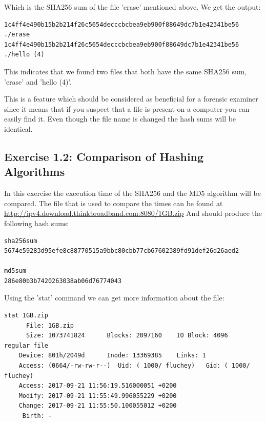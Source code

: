 \documentclass[a4paper,10pt,oneside]{article}
\begin{document}
Which is the SHA256 sum of the file 'erase' mentioned above. We get the output:

\begin{lstlisting}[caption=Result from above example]
1c4ff4e490b15b2b214f26c5654decccbcbea9eb900f88649dc7b1e42341be56  ./erase
1c4ff4e490b15b2b214f26c5654decccbcbea9eb900f88649dc7b1e42341be56  ./hello (4)
\end{lstlisting}

This indicates that we found two files that both have the same SHA256 sum, 'erase' and 'hello (4)'.

This is a feature which should be considered as beneficial for a forensic examiner since it means that if you suspect that a file is present on a computer you can
easily find it. Even though the file name is changed the hash sums will be identical.

\subsection{Exercise 1.2: Comparison of Hashing Algorithms}
In this exercise the execution time of the SHA256 and the MD5 algorithm will be compared. The file that is used to compare the times can be found at \url{http://ipv4.download.thinkbroadband.com:8080/1GB.zip}
And should produce the following hash sums:

\begin{lstlisting}[caption=Hash sums for file used in exercise]
sha256sum
5674e59283d95efe8c88770515a9bbc80cbb77cb67602389fd91def26d26aed2

md5sum
286e80b3b7420263038ab06d76774043
\end{lstlisting}

Using the 'stat' command we can get more information about the file:

\begin{lstlisting}[caption=Result from 'stat' command]
stat 1GB.zip
      File: 1GB.zip
      Size: 1073741824      Blocks: 2097160    IO Block: 4096   regular file
    Device: 801h/2049d      Inode: 13369385    Links: 1
    Access: (0664/-rw-rw-r--)  Uid: ( 1000/ fluchey)   Gid: ( 1000/ fluchey)
    Access: 2017-09-21 11:56:19.516000051 +0200
    Modify: 2017-09-21 11:55:49.996055229 +0200
    Change: 2017-09-21 11:55:50.100055012 +0200
     Birth: -
\end{lstlisting}
\end{document}
